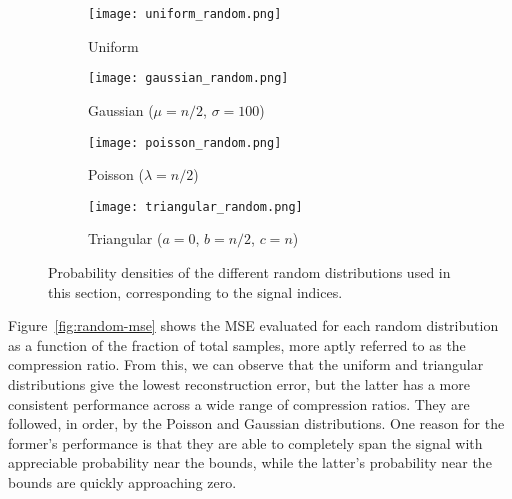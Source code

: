 \begin{figure}[htb]
	\centering
	\begin{subfigure}[h!]{0.49\textwidth}
		\centering
		\texttt{[image: uniform\_random.png]}
		\caption{Uniform}
		\label{fig:random-pdf-uniform}
	\end{subfigure}
	\begin{subfigure}[h!]{0.49\textwidth}
		\centering
		\texttt{[image: gaussian\_random.png]}
		\caption{Gaussian ($\mu = n/2$, $\sigma = 100$)}
		\label{fig:random-pdf-gaussian}
	\end{subfigure}
	\begin{subfigure}[h!]{0.49\textwidth}
		\centering
		\texttt{[image: poisson\_random.png]}
		\caption{Poisson ($\lambda = n/2$)}
		\label{fig:random-pdf-poisson}
	\end{subfigure}
	\begin{subfigure}[h!]{0.49\textwidth}
		\centering
		\texttt{[image: triangular\_random.png]}
		\caption{Triangular ($a = 0$, $b = n/2$, $c = n$)}
		\label{fig:random-pdf-triangular}
	\end{subfigure}
	\caption{Probability densities of the different random distributions used in this section, corresponding to the signal indices.}
	\label{fig:random-pdf}
\end{figure}

Figure~\ref{fig:random-mse} shows the MSE evaluated for each random distribution as a function of the fraction of total samples, more aptly referred to as the compression ratio. From this, we can observe that the uniform and triangular distributions give the lowest reconstruction error, but the latter has a more consistent performance across a wide range of compression ratios. They are followed, in order, by the Poisson and Gaussian distributions. One reason for the former's performance is that they are able to completely span the signal with appreciable probability near the bounds, while the latter's probability near the bounds are quickly approaching zero.

